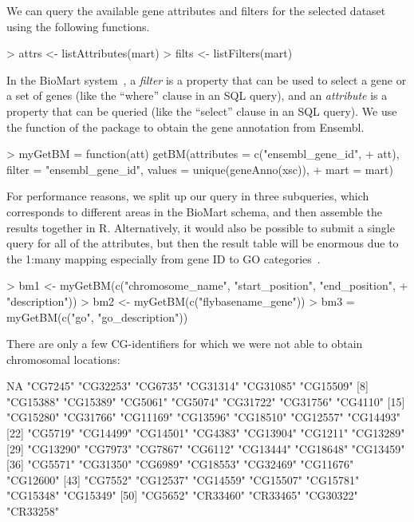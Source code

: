 % 
We can query the available gene attributes and filters for the
selected dataset using the following functions.
\begin{Schunk}
\begin{Sinput}
> attrs <- listAttributes(mart)
> filts <- listFilters(mart)
\end{Sinput}
\end{Schunk}
%
In the BioMart system~\cite{Kasprzyk2004}, a \emph{filter} is a
property that can be used to select a gene or a set of genes (like the
``where'' clause in an SQL query), and an \emph{attribute} is a
property that can be queried (like the ``select'' clause in an SQL
query). We use the  function of the package
 to obtain the gene annotation from Ensembl.
%
\begin{Schunk}
\begin{Sinput}
> myGetBM = function(att) getBM(attributes = c("ensembl_gene_id", 
+     att), filter = "ensembl_gene_id", values = unique(geneAnno(xsc)), 
+     mart = mart)
\end{Sinput}
\end{Schunk}
% 
For performance reasons, we split up our query in three subqueries,
which corresponds to different areas in the BioMart schema, and then
assemble the results together in R.  Alternatively, it would also be
possible to submit a single query for all of the attributes, but then
the result table will be enormous due to the 1:many mapping
especially from gene ID to GO categories~\cite{GO}.
%
\begin{Schunk}
\begin{Sinput}
> bm1 <- myGetBM(c("chromosome_name", "start_position", "end_position", 
+     "description"))
> bm2 <- myGetBM(c("flybasename_gene"))
> bm3 = myGetBM(c("go", "go_description"))
\end{Sinput}
\end{Schunk}
%
There are only a few CG-identifiers for which we were not able to
obtain chromosomal locations: 
%
\begin{Schunk}
\begin{Soutput}
 [1] NA        "CG7245"  "CG32253" "CG6735"  "CG31314" "CG31085" "CG15509"
 [8] "CG15388" "CG15389" "CG5061"  "CG5074"  "CG31722" "CG31756" "CG4110" 
[15] "CG15280" "CG31766" "CG11169" "CG13596" "CG18510" "CG12557" "CG14493"
[22] "CG5719"  "CG14499" "CG14501" "CG4383"  "CG13904" "CG1211"  "CG13289"
[29] "CG13290" "CG7973"  "CG7867"  "CG6112"  "CG13444" "CG18648" "CG13459"
[36] "CG5571"  "CG31350" "CG6989"  "CG18553" "CG32469" "CG11676" "CG12600"
[43] "CG7552"  "CG12537" "CG14559" "CG15507" "CG15781" "CG15348" "CG15349"
[50] "CG5652"  "CR33460" "CR33465" "CG30322" "CR33258"
\end{Soutput}
\end{Schunk}
